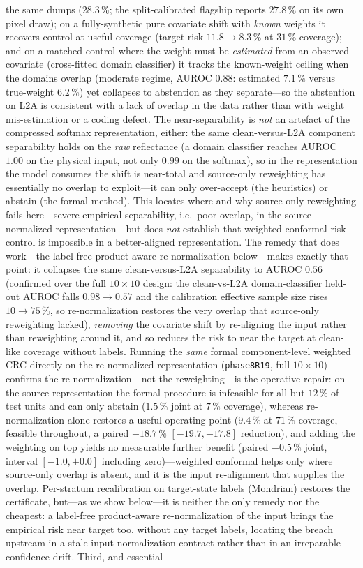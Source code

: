 \documentclass[preprint,3p,times]{elsarticle}
\begin{document}
the same dumps ($28.3\,\%$; the split-calibrated flagship reports $27.8\,\%$ on its own pixel draw); on a fully-synthetic pure covariate shift with \emph{known} weights it recovers control at useful coverage (target risk $11.8 \to 8.3\,\%$ at $31\,\%$ coverage); and on a matched control where the weight must be \emph{estimated} from an observed covariate (cross-fitted domain classifier) it tracks the known-weight ceiling when the domains overlap (moderate regime, AUROC $0.88$: estimated $7.1\,\%$ versus true-weight $6.2\,\%$) yet collapses to abstention as they separate---so the abstention on L2A is consistent with a lack of overlap in the data rather than with weight mis-estimation or a coding defect. The near-separability is \emph{not} an artefact of the compressed softmax representation, either: the same clean-versus-L2A component separability holds on the \emph{raw} reflectance (a domain classifier reaches AUROC $1.00$ on the physical input, not only $0.99$ on the softmax), so in the representation the model consumes the shift is near-total and source-only reweighting has essentially no overlap to exploit---it can only over-accept (the heuristics) or abstain (the formal method). This locates where and why source-only reweighting fails here---severe empirical separability, i.e.\ poor overlap, in the source-normalized representation---but does \emph{not} establish that weighted conformal risk control is impossible in a better-aligned representation. The remedy that does work---the label-free product-aware re-normalization below---makes exactly that point: it collapses the same clean-versus-L2A separability to AUROC $0.56$ (confirmed over the full $10\times10$ design: the clean-vs-L2A domain-classifier held-out AUROC falls $0.98 \to 0.57$ and the calibration effective sample size rises $10 \to 75\,\%$, so re-normalization restores the very overlap that source-only reweighting lacked), \emph{removing} the covariate shift by re-aligning the input rather than reweighting around it, and so reduces the risk to near the target at clean-like coverage without labels. Running the \emph{same} formal component-level weighted CRC directly on the re-normalized representation (\texttt{phase8R19}, full $10\times10$) confirms the re-normalization---not the reweighting---is the operative repair: on the source representation the formal procedure is infeasible for all but $12\,\%$ of test units and can only abstain ($1.5\,\%$ joint at $7\,\%$ coverage), whereas re-normalization alone restores a useful operating point ($9.4\,\%$ at $71\,\%$ coverage, feasible throughout, a paired $-18.7\,\%$ $[-19.7,-17.8]$ reduction), and adding the weighting on top yields no measurable further benefit (paired $-0.5\,\%$ joint, interval $[-1.0,+0.0]$ including zero)---weighted conformal helps only where source-only overlap is absent, and it is the input re-alignment that supplies the overlap. Per-stratum recalibration on target-state labels (Mondrian) restores the certificate, but---as we show below---it is neither the only remedy nor the cheapest: a label-free product-aware re-normalization of the input brings the empirical risk near target too, without any target labels, locating the breach upstream in a stale input-normalization contract rather than in an irreparable confidence drift. Third, and essential 
\end{document}
